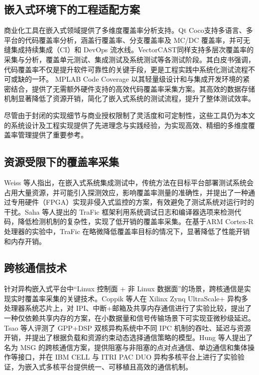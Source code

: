 \subsection{嵌入式环境下的工程适配方案}
    商业化工具在嵌入式领域提供了多维度覆盖率分析支持。Qt Coco\cite{qt2023coco}支持多语言、多平台的代码覆盖率分析，涵盖行覆盖率、分支覆盖率及 MC/DC 覆盖率，并可无缝集成持续集成（CI）和 DevOps 流水线。VectorCAST\cite{vector2020coverage}同样支持多层次覆盖率的采集与分析，覆盖单元测试、集成测试及系统测试等各测试阶段。其白皮书强调，代码覆盖率不仅是提升软件可靠性的关键手段，更是工程实践中系统化测试流程不可或缺的一环。 MPLAB Code Coverage\cite{microchip2020coverage} 以其轻量级设计和与集成开发环境的紧密结合，提供了无需额外硬件支持的高效代码覆盖率采集方案。其高效的数据存储机制显著降低了资源开销，简化了嵌入式系统的测试流程，提升了整体测试效率。
    
    尽管由于封闭的实现细节与商业授权限制了灵活度和可定制性，这些工具仍为本文的系统设计及工程实现提供了先进理念与实践经验，为实现高效、精细的多维度覆盖率管理提供了重要参考。

\subsection{资源受限下的覆盖率采集}
    Weiss 等人\cite{Weiss2024AchievingCS}指出，在嵌入式系统集成测试中，传统方法在目标平台部署测试系统会占用大量资源，并可能引入探测效应，影响覆盖率测量的准确性，并提出了一种通过专用硬件（FPGA）实现非侵入式监控的方案，有效避免了测试系统对运行时的干扰。Saha 等人\cite{Saha2021TraFicA}提出的 TraFic 框架利用系统调试日志和编译器选项来检测代码，降低检测机制的复杂性，实现了低开销的覆盖率采集。在基于ARM Cortex-R 处理器的实验中，TraFic 在略微降低覆盖率目标的情况下，显著降低了性能开销和内存开销。

\subsection{跨核通信技术}
    针对异构嵌入式平台中“Linux 控制面 + 非 Linux 数据面”的场景，跨核通信是实现实时覆盖率采集的关键技术。Coppik 等人\cite{coppik_et_al:OASIcs.NG-RES.2025.2}在 Xilinx Zynq UltraScale+ 异构多处理器系统芯片上，对 IPI、中断+邮箱及共享内存通信进行了实验比较，提出了一种仅依赖共享内存的方案，在小数据量和信号传输场景下可实现亚微秒级延迟。Tsao 等人\cite{tsao10.6688/JISE.2012.28.3.7}评测了 GPP+DSP 双核异构系统中不同 IPC 机制的吞吐、延迟与资源开销，并提出了根据负载和资源约束动态选择通信策略的模型。Hung 等人\cite{hung10.1016/j.sysarc.2010.11.003}提出了名为 MSG 的跨核通信方案，提供阻塞与非阻塞的点对点通信、单边通信和集体操作等接口，并在 IBM CELL 与 ITRI PAC DUO 异构多核平台上进行了实验验证，为嵌入式多核平台提供统一、可移植且高效的通信机制。

